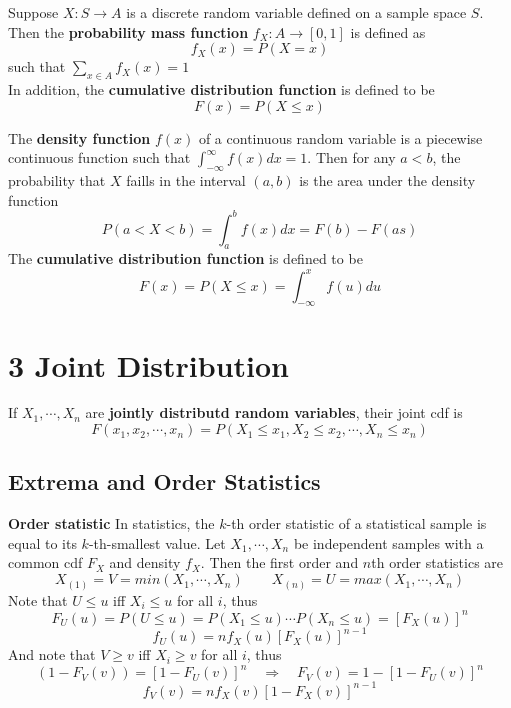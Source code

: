 \documentclass[11pt]{article}
\begin{document}
\begin{defn*}
  Suppose $X: S\to A$ is a discrete random variable defined on a sample space $S$. Then the \textbf{probability mass function} $f_X:A\to [0,1]$ is defined as
  \[
    f_X(x) = P(X=x)
  \]
  such that $\sum_{x\in A} f_X(x) = 1$\\ In addition, the \textbf{cumulative distribution function} is defined to be
  \[
    F(x) = P(X\leq x)
  \]
\end{defn*}

\begin{defn*}
  The \textbf{density function} $f(x)$ of a continuous random variable is a piecewise continuous function such that $\int_{-\infty}^{\infty} f(x) dx =1$. Then for any $a<b$, the probability that $X$ faills in the interval $(a,b)$ is the area under the density function
  \[
    P(a < X <b) = \int_{a}^{b} f(x) dx = F(b) - F(as)
  \]
  The \textbf{cumulative distribution function} is defined to be
  \[
    F(x) = P(X\leq x) =  \int_{-\infty}^{x} f(u)du
  \]
\end{defn*}


\section*{3 Joint Distribution}


\begin{defn*}
  If $X_1, \cdots, X_n$ are \textbf{jointly distributd random variables}, their joint cdf is
  \[
    F(x_1, x_2, \cdots, x_n) = P(X_1\leq x_1, X_2\leq x_2, \cdots, X_n \leq x_n)
  \]
\end{defn*}

\subsection*{Extrema and Order Statistics}

\begin{defn*}
  \textbf{Order statistic} In statistics, the $k$-th order statistic of a statistical sample is equal to its $k$-th-smallest value. Let $X_1, \cdots, X_n$ be independent samples with a common cdf $F_X$ and density $f_X$. Then the first order and $n$th order statistics are
  \[
    X_{(1)} = V = min(X_1, \cdots, X_n) \quad\quad X_{(n)} = U = max(X_1, \cdots, X_n)
  \]
  Note that $U \leq u$ iff $X_i \leq u$ for all $i$, thus
  \[
    F_U(u) = P(U \leq u) = P(X_1 \leq u) \cdots P(X_n \leq u) = [F_X(u)]^n
  \]
  \[
    f_U(u) = nf_X(u) [F_X(u)]^{n-1}
  \]
  And note that $V \geq v$ iff $X_i \geq v$ for all $i$, thus
  \[
    (1 - F_V(v)) = [1 - F_U(v)]^{n} \quad \Rightarrow \quad F_V(v) = 1 - [1 - F_U(v)]^{n}
  \]
  \[
    f_V(v) = nf_X(v)[1 - F_X(v)]^{n-1}
  \]
\end{defn*}
\end{document}
